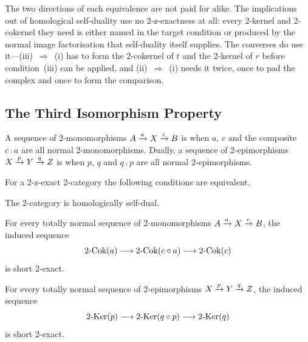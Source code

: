 \begin{remark}
  \label{Rem HSD Cost}
  The two directions of each equivalence are not paid for alike. The implications out of homological self-duality use no 2-z-exactness at all: every 2-kernel and 2-cokernel they need is either named in the target condition or produced by the normal image factorisation that self-duality itself supplies. The converses do use it---\mbox{(iii)~\(\Rightarrow\)~(i)} has to form the 2-cokernel of \(t\) and the 2-kernel of \(r\) before condition~(iii) can be applied, and \mbox{(ii)~\(\Rightarrow\)~(i)} needs it twice, once to pad the complex and once to form the comparison.
\end{remark}

\subsection{The Third Isomorphism Property}\label{SS:ThirdIso}

\begin{definition}
  \label{Def:TotallyNormal}  \leanok
  A sequence of 2-monomorphisms \(A\xrightarrow[]{a}X\xrightarrow[]{c}B\) is  when \(a\), \(c\) and the composite \(c\comp a\) are all normal 2-monomorphisms. Dually, a sequence of 2-epimorphisms \(X\xrightarrow[]{p}Y\xrightarrow[]{q}Z\) is  when \(p\), \(q\) and \(q\comp p\) are all normal 2-epimorphisms.
\end{definition}

\begin{proposition}
  \label{Third Iso}   \leanok
  For a 2-z-exact 2-category the following conditions are equivalent.
	\begin{tfae}
		\item The 2-category is homologically self-dual.
		\item For every totally normal sequence of 2-monomorphisms \(A\xrightarrow[]{a}X\xrightarrow[]{c}B\), the induced sequence
		\[
			2\text{-}\mathrm{Cok}(a)\longrightarrow2\text{-}\mathrm{Cok}(c\circ a)\longrightarrow2\text{-}\mathrm{Cok}(c)
		\]
		is short 2-exact.
		\item For every totally normal sequence of 2-epimorphisms \(X\xrightarrow[]{p}Y\xrightarrow[]{q}Z\), the induced sequence
		\[
			2\text{-}\mathrm{Ker}(p)\longrightarrow2\text{-}\mathrm{Ker}(q\circ p)\longrightarrow2\text{-}\mathrm{Ker}(q)
		\]
		is short 2-exact.
	\end{tfae}
\end{proposition}

